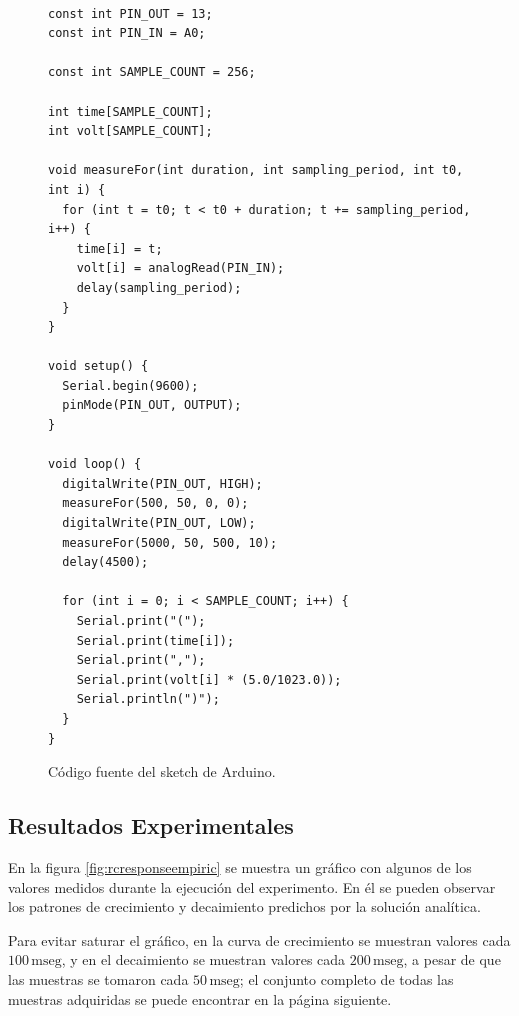 \documentclass[parskip]{scrartcl}
\begin{document}
\begin{figure}
\begin{lstlisting}[frame=single]

const int PIN_OUT = 13;
const int PIN_IN = A0;

const int SAMPLE_COUNT = 256;

int time[SAMPLE_COUNT];
int volt[SAMPLE_COUNT];

void measureFor(int duration, int sampling_period, int t0, int i) {
  for (int t = t0; t < t0 + duration; t += sampling_period, i++) {
    time[i] = t;
    volt[i] = analogRead(PIN_IN);
    delay(sampling_period);
  }
}

void setup() {
  Serial.begin(9600);
  pinMode(PIN_OUT, OUTPUT);
}

void loop() {
  digitalWrite(PIN_OUT, HIGH);
  measureFor(500, 50, 0, 0);
  digitalWrite(PIN_OUT, LOW);
  measureFor(5000, 50, 500, 10);
  delay(4500);
  
  for (int i = 0; i < SAMPLE_COUNT; i++) {
    Serial.print("(");
    Serial.print(time[i]);
    Serial.print(",");
    Serial.print(volt[i] * (5.0/1023.0));
    Serial.println(")");
  }
}

\end{lstlisting}
\caption{Código fuente del sketch de Arduino.}
\label{fig:sketch}
\end{figure}

\subsection{Resultados Experimentales}

En la figura \ref{fig:rcresponseempiric} se muestra un gráfico con algunos de los valores medidos durante la ejecución del experimento. En él se pueden observar los patrones de crecimiento y decaimiento predichos por la solución analítica.

Para evitar saturar el gráfico, en la curva de crecimiento se muestran valores cada $100\,\mathrm{mseg}$, y en el decaimiento se muestran valores cada $200\,\mathrm{mseg}$, a pesar de que las muestras se tomaron cada $50\,\mathrm{mseg}$; el conjunto completo de todas las muestras adquiridas se puede encontrar en la página siguiente.
\end{document}
